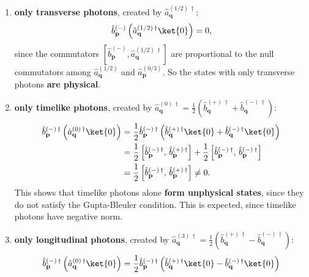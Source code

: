 \begin{enumerate}
    \item \textbf{only transverse photons}, created by \(\hat{a}^{(1/2)\,\dagger}_{\mathbf{q}}\):
          \[
              \hat{b}^{(-)}_{\mathbf{p}} \left( \hat{a}^{(1/2)\,\dagger}_{\mathbf{q}} \ket{0} \right) = 0,
          \]
          since the commutators \(\left[\hat{b}^{(-)}_{\mathbf{p}}, \hat{a}^{(1/2)\,\dagger}_{\mathbf{q}}\right]\) are proportional to the null commutators among \(\hat{a}^{(1/2)}_{\mathbf{q}}\) and \(\hat{a}^{(0/3)}_{\mathbf{p}}\). So the states with only transverse photons \textbf{are physical}.
    \item \textbf{only timelike photons}, created by \(\hat{a}^{(0)\,\dagger}_{\mathbf{q}} = \frac{1}{2}\left(\hat{b}^{(+)\,\dagger}_{\mathbf{q}} + \hat{b}^{(-)\,\dagger}_{\mathbf{q}}\right)\):
          \[
              \begin{aligned}
                  \hat{b}^{(-)\,\dagger}_{\mathbf{p}} \left( \hat{a}^{(0)\,\dagger}_{\mathbf{q}} \ket{0} \right) & = \frac{1}{2}\hat{b}^{(-)\,\dagger}_{\mathbf{p}} \left(\hat{b}^{(+)\,\dagger}_{\mathbf{q}} \ket{0} +  \hat{b}^{(-)\,\dagger}_{\mathbf{q}} \ket{0}\right)                                                         \\
                                                                                                                 & = \frac{1}{2}\left[ \hat{b}^{(-)\,\dagger}_{\mathbf{p}} ,\, \hat{b}^{(+)\,\dagger}_{\mathbf{p}}  \right] +\frac{1}{2} \left[ \hat{b}^{(-)\,\dagger}_{\mathbf{p}} ,\, \hat{b}^{(-)\,\dagger}_{\mathbf{p}} \right] \\
                                                                                                                 & = \frac{1}{2}\left[ \hat{b}^{(-)\,\dagger}_{\mathbf{p}} ,\, \hat{b}^{(+)\,\dagger}_{\mathbf{p}}  \right] \neq 0.
              \end{aligned}
          \]
          This shows that timelike photons alone \textbf{form unphysical states}, since they do not satisfy the Gupta-Bleuler condition. This is expected, since timelike photons have negative norm.
    \item \textbf{only longitudinal photons}, created by \(\hat{a}^{(3)\,\dagger}_{\mathbf{q}} = \frac{1}{2}\left(\hat{b}^{(+)\,\dagger}_{\mathbf{q}} - \hat{b}^{(-)\,\dagger}_{\mathbf{q}}\right)\):
          \[
              \begin{aligned}
                  \hat{b}^{(-)\,\dagger}_{\mathbf{p}} \left( \hat{a}^{(0)\,\dagger}_{\mathbf{q}} \ket{0} \right) & = \frac{1}{2}\hat{b}^{(-)\,\dagger}_{\mathbf{p}} \left(\hat{b}^{(+)\,\dagger}_{\mathbf{q}} \ket{0} -  \hat{b}^{(-)\,\dagger}_{\mathbf{q}} \ket{0}\right)                                                         \\

\end{aligned}\]
\end{enumerate}
